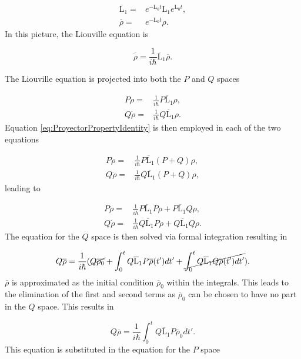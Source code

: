 \documentclass[12pt]{article}
\begin{document}
\begin{align}
    \overline{\mathrm{L}}_1 =& e^{-\mathrm{L}_0 t}\mathrm{L}_1e^{\mathrm{L}_0 t},\\
    \overline{\rho}=&e^{-\mathrm{L}_0 t}\rho.
\end{align} In this picture, the Liouville equation is

\begin{equation}
    \overline{\dot{\rho}} = \frac{1}{i\hbar}\overline{\mathrm{L}}_1 \overline{\rho}. 
\end{equation}

The Liouville equation is projected into both the $P$ and $Q$ spaces

\begin{align}
    P\dot{\rho} =& \frac{1}{i\hbar}P\overline{\mathrm{L}}_1\rho,\\
    Q\dot{\rho} =& \frac{1}{i\hbar}Q\overline{\mathrm{L}}_1\rho.
\end{align} Equation \eqref{eq:ProyectorPropertyIdentity} is then employed in each of the two equations

\begin{align}
    P\dot{\rho} =& \frac{1}{i\hbar}P\overline{\mathrm{L}}_1(P+Q)\rho,\\
    Q\dot{\rho} =& \frac{1}{i\hbar}Q\overline{\mathrm{L}}_1(P+Q)\rho,  
\end{align} leading to

\begin{align}
    P\dot{\rho} =& \frac{1}{i\hbar}P\overline{\mathrm{L}}_1P\rho+P\overline{\mathrm{L}}_1Q\rho,\\
    Q\dot{\rho} =& \frac{1}{i\hbar}Q\overline{\mathrm{L}}_1P\rho+Q\overline{\mathrm{L}}_1Q\rho.
\end{align} The equation for the $Q$ space is then solved via formal integration resulting in

\begin{equation}
    Q\overline{\rho} = \frac{1}{i\hbar}(\cancel{Q\overline{\rho_0}} + \int_0^t Q\overline{\mathrm{L}}_1P\overline{\rho}(t') dt'+\cancel{\int_0^t Q\overline{\mathrm{L}}_1Q\overline{\rho}(t') dt'}).
\end{equation}  $\overline{\rho}$ is approximated as the initial condition $\overline{\rho}_0$ within the integrals. This leads to the elimination of the first and second terms as $\overline{\rho}_0$ can be chosen to have no part in the $Q$ space. This results in

\begin{equation}
    Q\overline{\rho} = \frac{1}{i\hbar}\int_0^t Q\overline{\mathrm{L}}_1P\overline{\rho}_0 dt'.
\end{equation} This equation is substituted in the equation for the $P$ space
\end{document}

